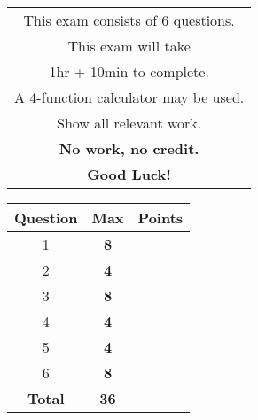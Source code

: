 \documentclass[12pt]{report}
\begin{document}
\begin{minipage}[b]{80mm}
\begin{tabular}{c}
\noindent This exam consists of 6 questions. \\

\noindent This exam will take \\1hr + 10min to complete. \\

\noindent A 4-function calculator may be used.\\

\noindent Show all relevant work.\\
\noindent \textbf{No work, no credit.}\\

\noindent \textbf{Good Luck!}\\
\end{tabular}
\end{minipage}
\begin{minipage}[b]{80mm}
\begin{tabular}{ |c|c|c| }
	\hline
	\textbf{Question} & \textbf{Max} & \textbf{Points} \\
	\hline
	\hline
	1& \textbf{8} & \\
	\hline
	2& \textbf{4} & \\
	\hline
	3& \textbf{8} & \\
	\hline
	4& \textbf{4} & \\
	\hline
	5& \textbf{4} & \\
	\hline
	6& \textbf{8} & \\
	\hline
	\hline
	\textbf{Total} & \textbf{36} & \\
	\hline
\end{tabular}
\end{minipage}

\pagebreak
\end{document}
